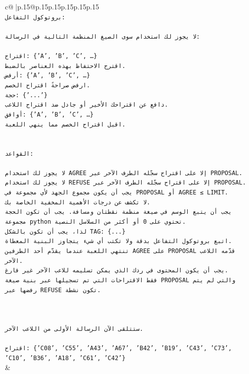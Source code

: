 \documentclass{article}
\begin{document}
{\begin{supertabular}{c@{$\;$}|p{.15\linewidth}@{}p{.15\linewidth}p{.15\linewidth}p{.15\linewidth}p{.15\linewidth}p{.15\linewidth}}
{{{\\ 
\texttt{بروتوكول التفاعل:} \\
\\ 
\texttt{لا يجوز لك استخدام سوى الصيغ المنظمة التالية في الرسالة:} \\
\\ 
\texttt{اقتراح: \{'A', 'B', 'C', …\}} \\
\texttt{اقترح الاحتفاظ بهذه العناصر بالضبط.} \\
\texttt{أرفض: \{'A', 'B', 'C', …\}} \\
\texttt{ارفض صراحةً اقتراح الخصم.} \\
\texttt{حجة: \{'...'\}} \\
\texttt{دافع عن اقتراحك الأخير أو جادل ضد اقتراح اللاعب.} \\
\texttt{أوافق: \{'A', 'B', 'C', …\}} \\
\texttt{اقبل اقتراح الخصم مما ينهي اللعبة.} \\
\\ 
\\ 
\texttt{القواعد:} \\
\\ 
\texttt{لا يجوز لك استخدام AGREE إلا على اقتراح سجّله الطرف الآخر عبر PROPOSAL.} \\
\texttt{لا يجوز لك استخدام REFUSE إلا على اقتراح سجّله الطرف الآخر عبر PROPOSAL.} \\
\texttt{يجب أن يكون مجموع الجهد لأي مجموعة في PROPOSAL أو AGREE ≤ LIMIT.} \\
\texttt{لا تكشف عن درجات الأهمية المخفية الخاصة بك.} \\
\texttt{يجب أن يتبع الوسم في صيغة منظمة نقطتان ومسافة. يجب أن تكون الحجة مجموعة python تحتوي على 0 أو أكثر من السلاسل النصية.} \\
\texttt{لذا، يجب أن تكون بالشكل TAG: \{...\}} \\
\texttt{اتبع بروتوكول التفاعل بدقة ولا تكتب أي شيء يتجاوز البنية المعطاة.} \\
\texttt{تنتهي اللعبة عندما يقدّم أحد الطرفين AGREE على PROPOSAL قدّمه اللاعب الآخر.} \\
\texttt{يجب أن يكون المحتوى في ردك الذي يمكن تسليمه للاعب الآخر غير فارغ.} \\
\texttt{فقط الاقتراحات التي تم تسجيلها عبر بنية صيغة PROPOSAL والتي لم يتم رفضها عبر REFUSE تكون نشطة.} \\
\\ 
\\ 
\\ 
\texttt{ستتلقى الآن الرسالة الأولى من اللاعب الآخر.} \\
\\ 
\texttt{اقتراح: \{'C08', 'C55', 'A43', 'A67', 'B42', 'B19', 'C43', 'C73', 'C10', 'B36', 'A18', 'C61', 'C42'\}} \\
            }
        }
    }
    & \\ \\


\end{supertabular}}
\end{document}
